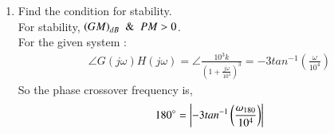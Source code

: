 \begin{enumerate}[label=\arabic*.,ref=\theenumi]
\begin{table}[!ht]
\centering

\caption{}
\label{table:ee18btech11006_Factors}
\end{table}
\item Find the condition for stability.
\\
\solution 
For stability, $\left(GM\right)_{dB} \And PM > 0$. \\
For the given system :
\begin{align}
   \angle G(j\omega)H(j\omega) =  \angle\frac{10^3k}{\left(1+\frac{j\omega}{10^4}\right)^3} 
   = -3tan^{-1}\left({\frac{\omega}{10^4}}\right)
\end{align}
So the phase crossover frequency is,
\begin{align}
   180^{\circ}= \abs{-3tan^{-1}\left({\frac{\omega_{180}}{10^4}}\right)}\\

\end{align}
\end{enumerate}
